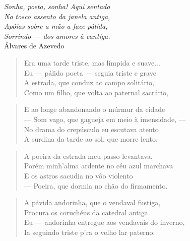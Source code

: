 \begin{anexosenv}
\begin{flushright}
\textit{Sonha, poeta, sonha! Aqui sentado \\
No tosco assento da janela antiga,\\
Apóias sobre a mão a face pálida,\\
Sorrindo — dos amores à cantiga.}\\
Álvares de Azevedo
\end{flushright}

\begin{verse}
Era uma tarde triste, mas límpida e suave... \\
Eu — pálido poeta — seguia triste e grave \\
A estrada, que conduz ao campo solitário, \\
Como um filho, que volta ao paternal sacrário, \\
\end{verse}

\begin{verse}
E ao longe abandonando o múrmur da cidade \\
— Som vago, que gagueja em meio à imensidade, — \\
No drama do crepúsculo eu escutava atento \\
A surdina da tarde ao sol, que morre lento. \\
\end{verse}

\begin{verse}
A poeira da estrada meu passo levantava, \\
Porém minh'alma ardente no céu azul marchava \\
E os astros sacudia no vôo violento \\
— Poeira, que dormia no chão do firmamento. \\
\end{verse}

\begin{verse}
A pávida andorinha, que o vendaval fustiga, \\
Procura os coruchéus da catedral antiga. \\
Eu — andorinha entregue aos vendavais do inverno, \\
Ia seguindo triste p'ra o velho lar paterno. \\
\end{verse}


\end{anexosenv}
